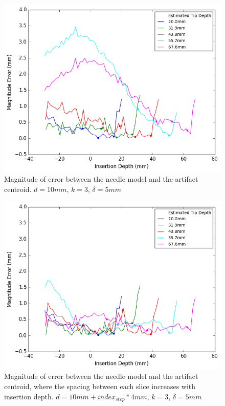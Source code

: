 \begin{figure}[h]
\includegraphics[width=1.0\textwidth]{Fig/chap5/error_curve_3_10.png}
\caption{Magnitude of error between the needle model and the artifact centroid.  $d=10mm$, $k=3$, $\delta=5mm$}
\label{fig:curve_errors_fixed_spacing}
\end{figure}

\begin{figure}[h]
\includegraphics[width=1.0\textwidth]{Fig/chap5/error_curve_3_var.png}
\caption{Magnitude of error between the needle model and the artifact centroid, where the spacing between each slice increases with insertion depth.  $d=10mm + index_{step}*4mm$, $k=3$, $\delta=5mm$ }
\label{fig:curve_errors_variable_spacing}
\end{figure}


